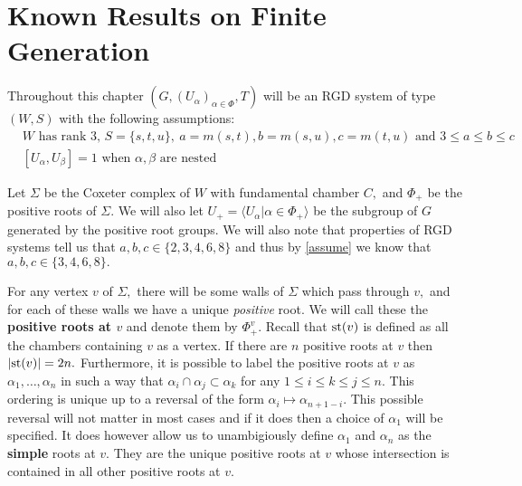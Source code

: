 \documentclass[class=book, crop=false,12 pt]{standalone}
\begin{document}
\chapter{Known Results on Finite Generation}
\label{ch:known}

Throughout this chapter $(G,(U_\alpha)_{\alpha\in \Phi},T)$ will be an RGD system of type $(W,S)$ with the following assumptions:
\smallskip
\begin{equation}
	\label{assume}
	\tag{A} 
\begin{aligned}
	&W \text{ has rank 3, }S=\{s,t,u\},\: a=m(s,t),b=m(s,u),c=m(t,u)\text{ and }3\le a\le b\le c\\
	&[U_\alpha,U_\beta]=1\text{ when }\alpha,\beta \text{ are nested}
\end{aligned}
\end{equation}
\smallskip

Let $\Sigma$ be the Coxeter complex of $W$ with fundamental chamber $C,$ and $\Phi_+$ be the positive roots of $\Sigma.$ We will also let $U_+=\langle U_\alpha|\alpha\in \Phi_+\rangle$ be the subgroup of $G$ generated by the positive root groups. We will also note that properties of RGD systems tell us that $a,b,c\in \{2,3,4,6,8\}$ and thus by \eqref{assume} we know that $a,b,c\in \{3,4,6,8\}.$


For any vertex $v$ of $\Sigma,$ there will be some walls of $\Sigma$ which pass through $v,$ and for each of these walls we have a unique \emph{positive} root. We will call these the \textbf{positive roots at $v$} and denote them by $\Phi_+^v.$ Recall that $\mathrm{st}(v)$ is defined as all the chambers containing $v$ as a vertex. If there are $n$ positive roots at $v$ then $|\mathrm{st}(v)|=2n.$ Furthermore, it is possible to label the positive roots at $v$ as $\alpha_1,\dots,\alpha_n$ in such a way that $\alpha_i\cap \alpha_j\subset \alpha_k$ for any $1\le i\le k\le j\le n.$ This ordering is unique up to a reversal of the form $\alpha_i\mapsto \alpha_{n+1-i}.$ This possible reversal will not matter in most cases and if it does then a choice of $\alpha_1$ will be specified. It does however allow us to unambigiously define $\alpha_1$ and $\alpha_n$ as the \textbf{simple} roots at $v.$ They are the unique positive roots at $v$ whose intersection is contained in all other positive roots at $v.$
\end{document}

